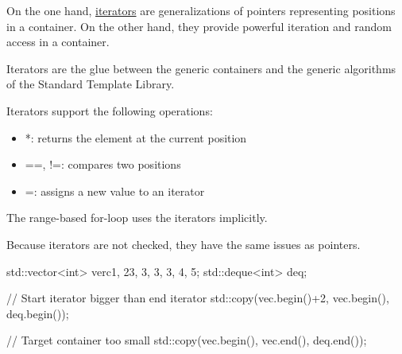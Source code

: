 
On the one hand, \href{http://en.cppreference.com/w/cpp/header/iterator}{iterators} are generalizations of pointers representing positions in a container. On the other hand, they provide powerful iteration and random access in a container.

Iterators are the glue between the generic containers and the generic algorithms of the Standard Template Library.

Iterators support the following operations:

\begin{itemize}
\item 
*: returns the element at the current position

\item 
==, !=: compares two positions

\item 
=: assigns a new value to an iterator
\end{itemize}

The range-based for-loop uses the iterators implicitly.

Because iterators are not checked, they have the same issues as pointers.

\begin{cpp}
std::vector<int> verc{1, 23, 3, 3, 3, 4, 5};
std::deque<int> deq;

// Start iterator bigger than end iterator
std::copy(vec.begin()+2, vec.begin(), deq.begin());

// Target container too small
std::copy(vec.begin(), vec.end(), deq.end());
\end{cpp}


































